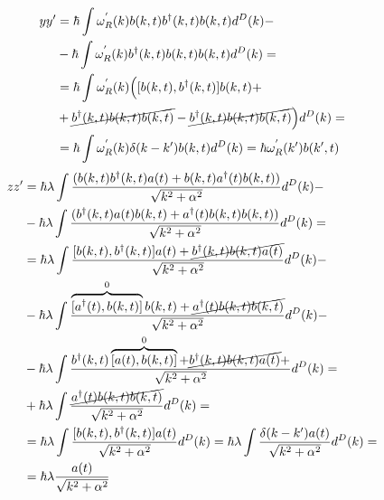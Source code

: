 \begin{equation}\notag
    \begin{split}
        yy' & = \hbar \int \omega^{'}_{R}(k) b(k,t) b^{\dagger}(k,t) b(k,t) d^{D}(k) - \\
        & - \hbar \int \omega^{'}_{R}(k) b^{\dagger}(k,t) b(k,t) b(k,t) d^{D}(k) = \\
        & = \hbar \int \omega^{'}_{R}(k) \Bigl([b(k,t), b^{\dagger}(k,t)] b(k,t) + \\
        & + \cancel{b^{\dagger}(k,t) b(k,t) b(k,t)} - \cancel{b^{\dagger}(k,t) b(k,t) b(k,t)} \Bigr) d^{D}(k) = \\
        & = \hbar \int \omega^{'}_{R}(k) \delta (k-k') b(k,t) d^{D}(k) = \hbar \omega^{'}_{R}(k') b(k',t)
    \end{split}
\end{equation}
\begin{equation}\notag
    \begin{split}
        zz' & = \hbar \lambda \int \frac{(b(k,t) b^{\dagger}(k,t) a(t) + b(k,t) a^{\dagger}(t) b(k,t))}{\sqrt{k^{2} + \alpha^{2}}} d^{D}(k) - \\
        & - \hbar \lambda \int \frac{(b^{\dagger}(k,t) a(t) b(k,t) + a^{\dagger}(t) b(k,t) b(k,t))}{\sqrt{k^{2} + \alpha^{2}}} d^{D}(k) = \\
        & = \hbar \lambda \int \frac{[b(k,t), b^{\dagger}(k,t)] a(t) + \cancel{b^{\dagger}(k,t) b(k,t) a(t)}}{\sqrt{k^{2} + \alpha^{2}}} d^{D}(k) - \\
        & - \hbar \lambda \int \frac{\overbrace{[a^{\dagger}(t), b(k,t)]}^{0} b(k,t) + \cancel{a^{\dagger}(t) b(k,t) b(k,t)}}{\sqrt{k^{2} + \alpha^{2}}} d^{D}(k) - \\
        & - \hbar \lambda \int \frac{b^{\dagger}(k,t) \overbrace{[a(t), b(k,t)]}^{0} + \cancel{b^{\dagger}(k,t) b(k,t) a(t)} + }{\sqrt{k^{2} + \alpha^{2}}} d^{D}(k) = \\
        & + \hbar \lambda \int \frac{\cancel{a^{\dagger}(t) b(k,t) b(k,t)}}{\sqrt{k^{2} + \alpha^{2}}} d^{D}(k) = \\
        & = \hbar \lambda \int \frac{[b(k,t), b^{\dagger}(k,t)] a(t)}{\sqrt{k^{2} + \alpha^{2}}} d^{D}(k) = \hbar \lambda \int \frac{\delta (k-k') a(t)}{\sqrt{k^{2} + \alpha^{2}}} d^{D}(k) = \\
        & = \hbar \lambda \frac{a(t)}{\sqrt{k^{2} + \alpha^{2}}}
    \end{split}
\end{equation}

